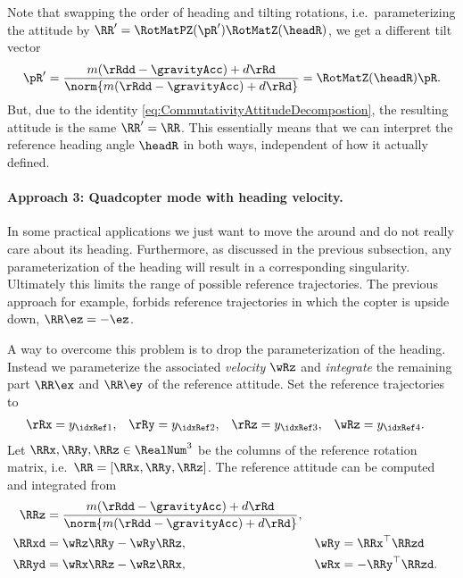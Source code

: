 Note that swapping the order of heading and tilting rotations, i.e.\ parameterizing the attitude by $\RR' = \RotMatPZ(\pR') \RotMatZ(\headR)$, we get a different tilt vector
\begin{align}
 \pR' = \frac{m(\rRdd-\gravityAcc) + d\rRd}{\norm{m(\rRdd-\gravityAcc) + d\rRd}} = \RotMatZ(\headR) \pR.
\end{align}
But, due to the identity \eqref{eq:CommutativityAttitudeDecompostion}, the resulting attitude is the same $\RR' = \RR$.
This essentially means that we can interpret the reference heading angle $\headR$ in both ways, independent of how it actually defined.


\paragraph{Approach 3: Quadcopter mode with heading velocity.}
In some practical applications we just want to move the \Quadcopter around and do not really care about its heading.
Furthermore, as discussed in the previous subsection, any parameterization of the heading will result in a corresponding singularity.
Ultimately this limits the range of possible reference trajectories.
The previous approach for example, forbids reference trajectories in which the copter is upside down, $\RR \ez = -\ez$. 

A way to overcome this problem is to drop the parameterization of the heading.
Instead we parameterize the associated \textit{velocity} $\wRz$ and \textit{integrate} the remaining part $\RR \ex$ and $\RR \ey$ of the reference attitude.
Set the reference trajectories to
\begin{align}
 \rRx &= y_{\idxRef1},&
 \rRy &= y_{\idxRef2},&
 \rRz &= y_{\idxRef3},&
 \wRz &= y_{\idxRef4}.
\end{align}
Let $\RRx, \RRy, \RRz \in \RealNum^3$ be the columns of the reference rotation matrix, i.e.\ $\RR = [\RRx, \RRy, \RRz]$.
The reference attitude can be computed and integrated from
\begin{align}
 \RRz &= \frac{m(\rRdd-\gravityAcc) + d\rRd}{\norm{m(\rRdd-\gravityAcc) + d\rRd}},
\\
 \RRxd &= \wRz \RRy - \wRy \RRz,&
 \wRy &= \RRx^\top \RRzd
\\
 \RRyd &= \wRx \RRz - \wRz \RRx,&
 \wRx &= -\RRy^\top \RRzd.
\end{align}




